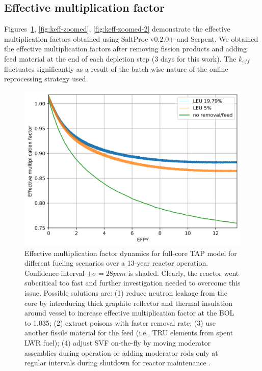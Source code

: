 \documentclass[12pt]{article} %
\begin{document}
\subsection{Effective multiplication factor}
Figures~\ref{fig:keff}, \ref{fig:keff-zoomed}, \ref{fig:keff-zoomed-2} demonstrate 
the effective 
multiplication factors  obtained using SaltProc v0.2.0+ and Serpent. We obtained 
the effective multiplication factors after removing fission products 
and adding feed material at the end of each depletion step (3 days for this 
work). The $k_{eff}$ fluctuates significantly as a result of the batch-wise 
nature of the online reprocessing strategy used.
\begin{figure}[htp!] %
		  \includegraphics[width=1.05\textwidth]{keff_3.png}
	\vspace{-0.2in}
  \caption{Effective multiplication factor dynamics for full-core
   \gls{TAP} model for different fueling scenarios over a 13-year reactor operation. 
   Confidence interval $\pm\sigma=28pcm$ is shaded. Clearly, the reactor went 
   subcritical too fast and further investigation needed to overcome this issue. 
   Possible solutions are: (1) reduce neutron leakage from the core by 
   introducing thick graphite reflector and thermal insulation around 
   vessel to increase effective multiplication factor at the 
   \gls{BOL} to 1.035; (2) extract poisons with faster removal rate;
   (3) use another fissile material for the feed (i.e., \gls{TRU} elements from spent 
   \gls{LWR} fuel); (4) adjust \gls{SVF} on-the-fly by 
   moving moderator assemblies during operation 
   \cite{transatomic_power_corporation_technical_2016} or adding moderator rods 
   only at regular intervals during shutdown for reactor maintenance  \cite{betzler_fuel_2018}.}
  \label{fig:keff}
\end{figure}
\end{document}
